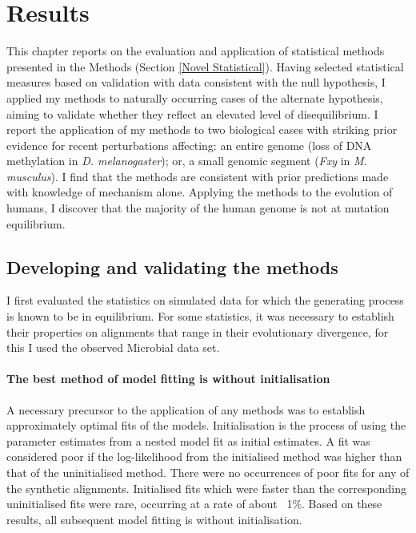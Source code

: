 \chapter{Results}

This chapter reports on the evaluation and application of statistical methods presented in the Methods (Section \ref{Novel Statistical}). Having selected statistical measures based on validation with data consistent with the null hypothesis, I applied my methods to naturally occurring cases of the alternate hypothesis, aiming to validate whether they reflect an elevated level of disequilibrium. I report the application of my methods to two biological cases with striking prior evidence for recent perturbations affecting: an entire genome (loss of DNA methylation in \textit{D. melanogaster}); or, a small genomic segment (\textit{Fxy} in \textit{M. musculus}). I find that the methods are consistent with prior predictions made with knowledge of mechanism alone. Applying the methods to the evolution of humans, I discover that the majority of the human genome is not at mutation equilibrium.

\section{Developing and validating the methods}
\label{Simulation}

I first evaluated the statistics on simulated data for which the generating process is known to be in equilibrium. For some statistics, it was necessary to establish their properties on alignments that range in their evolutionary divergence, for this I used the observed Microbial data set.  

\subsubsection{The best method of model fitting is without initialisation}

A necessary precursor to the application of any methods was to establish approximately optimal fits of the models. Initialisation is the process of using the parameter estimates from a nested model fit  as initial estimates. A fit was considered poor if the log-likelihood from the initialised method was higher than that of the uninitialised method. There were no occurrences of poor fits for any of the synthetic alignments. Initialised fits which were faster than the corresponding uninitialised fits were rare, occurring at a rate of about ~1\%. Based on these results, all subsequent model fitting is without initialisation.

